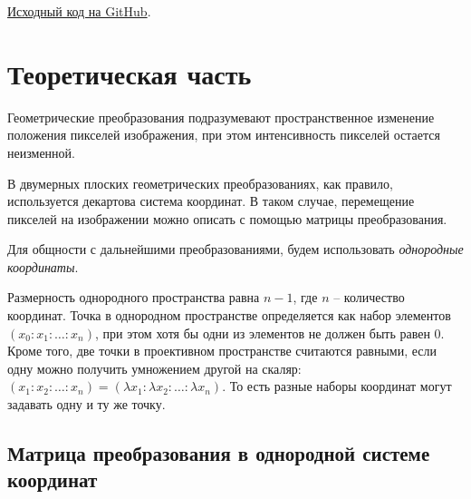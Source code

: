 





\href{https://github.com/edelwiw/TechVision_Lab2}{Исходный код на GitHub}. 

\section{Теоретическая часть}

Геометрические преобразования подразумевают пространственное изменение положения 
пикселей изображения, при этом интенсивность пикселей остается неизменной.

В двумерных плоских геометрических преобразованиях, как правило, используется декартова система координат.
В таком случае, перемещение пикселей на изображении можно описать с помощью матрицы преобразования.

Для общности с дальнейшими преобразованиями, будем использовать \textit{однородные координаты}.

Размерность однородного пространства равна $n - 1$, где $n$ -- количество координат.
Точка в однородном пространстве определяется как набор элементов $\left(x_0:x_1:\ldots:x_n\right)$, при этом хотя бы одни из элементов не должен быть равен 0. 
Кроме того, две точки в проективном пространстве считаются равными, если одну можно получить умножением другой на скаляр: $\left(x_1:x_2:\ldots:x_n\right)=\left(\lambda x_1:\lambda x_2:\ldots:\lambda x_n\right)$. То есть разные наборы координат могут задавать одну и ту же точку.   

\subsection{Матрица преобразования в однородной системе координат}

